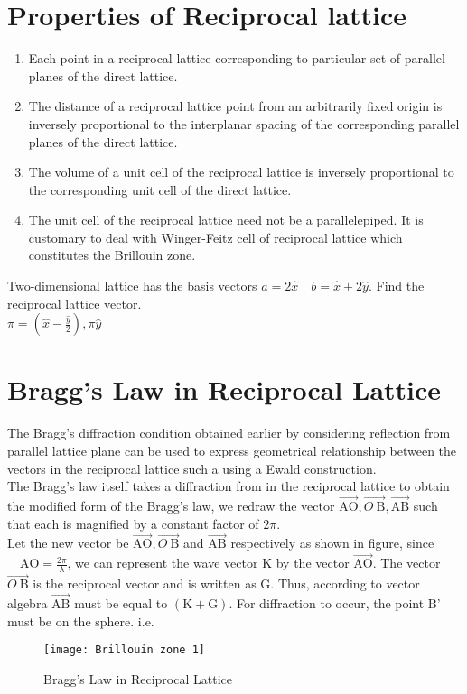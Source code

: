 \section{Properties of Reciprocal lattice}
\begin{enumerate}
	\item Each point in a reciprocal lattice corresponding to particular set of parallel planes of the direct lattice.
	\item The distance of a reciprocal lattice point from an arbitrarily fixed origin is inversely proportional to the interplanar spacing of the corresponding parallel planes of the direct lattice.
	\item The volume of a unit cell of the reciprocal lattice is inversely proportional to the corresponding unit cell of the direct lattice.
	\item The unit cell of the reciprocal lattice need not be a parallelepiped. It is customary to deal with Winger-Feitz cell of reciprocal lattice which constitutes the Brillouin zone.
\end{enumerate}
\begin{example}
	 Two-dimensional lattice has the basis vectors $a=2 \hat{x} \quad b=\hat{x}+2 \hat{y}$. Find the reciprocal lattice vector.\\
	 $\pi=\left(\hat{x}-\frac{\hat{y}}{2}\right), \pi \hat{y}$
\end{example}

\section{Bragg's Law in Reciprocal Lattice}
The Bragg's diffraction condition obtained earlier by considering reflection from parallel lattice plane can be used to express geometrical relationship between the vectors in the reciprocal lattice such a using a Ewald construction.\\
The Bragg's law itself takes a diffraction from in the reciprocal lattice to obtain the modified form of the Bragg's law, we redraw the vector $\overrightarrow{\mathrm{AO}}, \overrightarrow{O \mathrm{~B}}, \overrightarrow{\mathrm{AB}}$ such that each is magnified by a constant factor of $2 \pi$. \\
Let the new vector be $\overrightarrow{\mathrm{AO}}, \overrightarrow{O \mathrm{~B}}$ and $\overrightarrow{\mathrm{AB}}$ respectively as shown in figure, since $\quad \mathrm{AO}=\frac{2 \pi}{\lambda}$, we can represent the wave vector $\mathrm{K}$ by the vector $\overrightarrow{\mathrm{AO}}$. The vector $\overrightarrow{O \mathrm{~B}}$ is the reciprocal vector and is written as $\mathrm{G}$. Thus, according to vector algebra $\overrightarrow{\mathrm{AB}}$ must be equal to $(\mathrm{K}+\mathrm{G})$. For diffraction to occur, the point B' must be on the sphere. i.e.
\begin{figure}[H]
	\centering
	\texttt{[image: Brillouin zone 1]}
	\caption{Bragg's Law in Reciprocal Lattice}
	\label{Bragg's Law in Reciprocal Lattice}
\end{figure}

